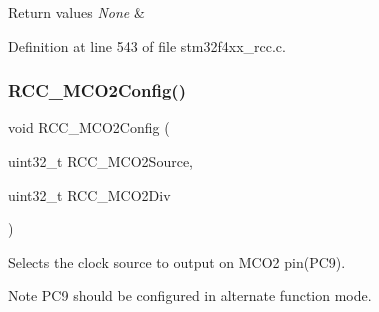 \begin{DoxyRetVals}{Return values}
{\em None} & \\
\hline
\end{DoxyRetVals}


Definition at line 543 of file stm32f4xx\+\_\+rcc.\+c.

\mbox{\label{group___r_c_c_gaf50f10675b747de60c739e44e5c22aee}} 
\subsubsection{\texorpdfstring{R\+C\+C\+\_\+\+M\+C\+O2\+Config()}{RCC\_MCO2Config()}}
{\footnotesize\ttfamily void R\+C\+C\+\_\+\+M\+C\+O2\+Config (\begin{DoxyParamCaption}\item[{uint32\+\_\+t}]{R\+C\+C\+\_\+\+M\+C\+O2\+Source,  }\item[{uint32\+\_\+t}]{R\+C\+C\+\_\+\+M\+C\+O2\+Div }\end{DoxyParamCaption})}



Selects the clock source to output on M\+C\+O2 pin(\+P\+C9). 

\begin{DoxyNote}{Note}
P\+C9 should be configured in alternate function mode. 
\end{DoxyNote}

